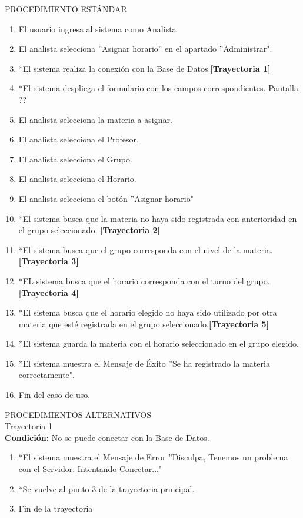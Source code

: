 \vspace*{1cm}
\noindent
\Large{PROCEDIMIENTO ESTÁNDAR}
\large{}
\begin{enumerate}
    \item El usuario ingresa al sistema como Analista
	\item El analista selecciona ''Asignar horario'' en el apartado ''Administrar".
	\item *El sistema realiza la conexión con la Base de Datos.\textbf{[Trayectoria 1]}
	\item *El sistema despliega el formulario con los campos correspondientes. Pantalla ??
	\item El analista selecciona la materia a asignar.
	\item El analista selecciona el Profesor.
	\item El analista selecciona el Grupo.
	\item El analista selecciona el Horario.
	\item El analista selecciona el botón ''Asignar horario"
	\item *El sistema busca que la materia no haya sido registrada con anterioridad en el grupo seleccionado. \textbf{[Trayectoria 2]}
	\item *El sistema busca que el grupo corresponda con el nivel de la materia.\textbf{[Trayectoria 3]}
	\item *EL sistema busca que el horario corresponda con el turno del grupo.\textbf{[Trayectoria 4]}
	\item *El sistema busca que el horario elegido no haya sido utilizado por otra materia que esté registrada en el grupo seleccionado.\textbf{[Trayectoria 5]}
	\item *El sistema guarda la materia con el horario seleccionado en el grupo elegido.
	\item *El sistema muestra el Mensaje de Éxito ''Se ha registrado la materia correctamente".
	\item Fin del caso de uso.
\end{enumerate}
\vspace*{1cm}
\Large{PROCEDIMIENTOS ALTERNATIVOS}\\
	\large{Trayectoria 1}\\
		\textbf{Condición:} No se puede conectar con la Base de Datos.
		\begin{enumerate}
			\item *El sistema muestra el Mensaje de Error ''Disculpa, Tenemos un problema con el Servidor. Intentando Conectar..."
			\item *Se vuelve al punto 3 de la trayectoria principal.
			\item Fin de la trayectoria
		\end{enumerate}
